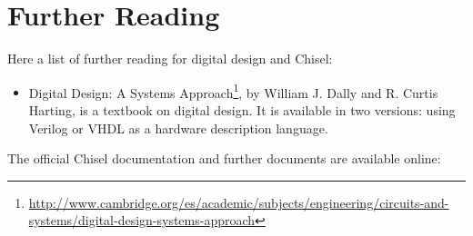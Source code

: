 \documentclass[%
    10pt,
    headinclude, footexclude,
    openright, %
    notitlepage,
    cleardoubleempty,
    headsepline,
    pointlessnumbers,
    bibtotoc, idxtotoc,
    ]{scrbook}
\newcommand{\myref}[2]{\href{#1}{#2}}
\renewcommand{\myref}[2]{{#2}{\footnote{\url{#1}}}}
\begin{document}
\section{Further Reading}

Here a list of further reading for digital design and Chisel:
\begin{itemize}
\item \myref{http://www.cambridge.org/es/academic/subjects/engineering/circuits-and-systems/digital-design-systems-approach}{Digital Design: A Systems Approach}, by William J. Dally and R. Curtis Harting,
is a textbook on digital design. It is available in two versions: using Verilog or VHDL as a hardware description language.
\end{itemize}

The official Chisel documentation and further documents are available online:
\end{document}
